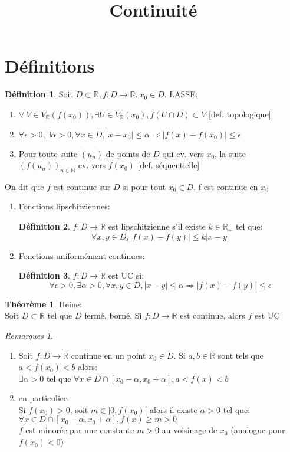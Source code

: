 \documentclass[fleqn]{article}
\title{Continuit\'e}
\date{}
\theoremstyle{definition} \newtheorem*{defi}{D\'efinition}
\theoremstyle{definition} \newtheorem*{theo}{Th\'eor\`eme}
\theoremstyle{definition} \newtheorem*{coro}{Corollaire}
\theoremstyle{remark} \newtheorem*{rqs}{Remarques}
\begin{document}
\maketitle

\section{D\'efinitions}
\begin{defi}
	Soit $D \subset \mathbb{R}, f:D \rightarrow \mathbb{R}.\ x_0 \in D$. LASSE:
	\begin{enumerate}
		\item $\forall\ V \in V_\mathbb{R}(f(x_0)), \exists U \in V_\mathbb{R}(x_0), f(U \cap D) \subset V$ [def. topologique]
		\item $\forall \epsilon>0, \exists \alpha > 0, \forall x \in D, |x-x_0| \leq \alpha \Rightarrow |f(x) - f(x_0)| \leq \epsilon$
		\item Pour toute suite $(u_n)$ de points de $D$ qui cv. vers $x_0$, la suite $(f(u_n))_{n\in\mathbb{N}}$ cv. vers $f(x_0)$
		[def. s\'equentielle]
	\end{enumerate}
	On dit que $f$ est continue sur $D$ si pour tout $x_0 \in D$, f est continue en $x_0$
\end{defi}
\begin{enumerate}
	\item Fonctions lipschitziennes:
		\begin{defi}
			$f:D \rightarrow \mathbb{R}$ est lipschitzienne s'il existe $k \in \mathbb{R}_+$ tel que:
			\[\forall x,y \in D, |f(x) - f(y)| \leq k|x-y|\]
		\end{defi}
	\item Fonctions uniform\'ement continues:
		\begin{defi}
			$f:D \rightarrow \mathbb{R}$ est UC si:
			\[\forall \epsilon >0, \exists \alpha>0, \forall x,y \in D, |x-y| \leq \alpha \Rightarrow |f(x) - f(y)| \leq \epsilon\]
		\end{defi}
\end{enumerate}
\begin{theo} Heine: \\
	Soit $D \subset \mathbb{R}$ tel que $D$ ferm\'e, born\'e. Si $f:D \rightarrow \mathbb{R}$ est continue, alors $f$ est UC
\end{theo}
\begin{rqs} $ $
	\begin{enumerate}
		\item Soit $f: D \rightarrow \mathbb{R}$ continue en un point $x_0 \in D$. Si $a, b \in \mathbb{R}$ sont tels que $a < f(x_0) < b$
			alors: \\
			$ \exists \alpha > 0$ tel que $\forall x \in D \cap [x_0 - \alpha, x_0 + \alpha], a < f(x) < b$
		\item en particulier: \\
			Si $f(x_0) > 0$, soit $m \in ]0, f(x_0)[$ alors il existe $\alpha >0$ tel que:
			$\forall x \in D \cap [x_0 - \alpha, x_0 + \alpha], f(x) \geq m > 0$ \\
			$f$ est minor\'ee par une constante $m>0$ au voisinage de $x_0$ (analogue pour $f(x_0) < 0$)
	\end{enumerate}
\end{rqs}
\end{document}
